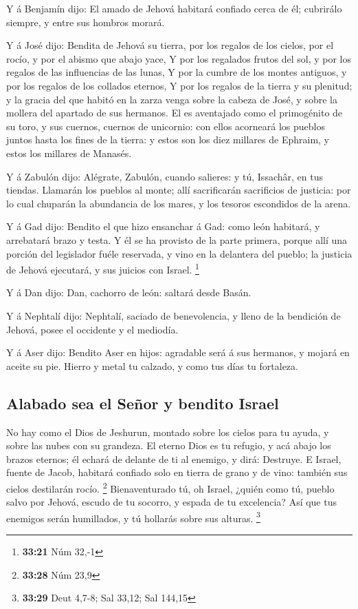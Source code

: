  Y á Benjamín dijo: El amado de Jehová habitará confiado
cerca de él; cubrirálo siempre, y entre sus hombros morará.

 Y á José dijo: Bendita de Jehová su tierra, por los
regalos de los cielos, por el rocío, y por el abismo que abajo yace,
 Y por los regalados frutos del sol, y por los regalos de
las influencias de las lunas,  Y por la cumbre de los
montes antiguos, y por los regalos de los collados eternos,
 Y por los regalos de la tierra y su plenitud; y la gracia
del que habitó en la zarza venga sobre la cabeza de José, y sobre la
mollera del apartado de sus hermanos.  El es aventajado
como el primogénito de su toro, y sus cuernos, cuernos de unicornio: con
ellos acorneará los pueblos juntos hasta los fines de la tierra: y estos
son los diez millares de Ephraim, y estos los millares de Manasés.

 Y á Zabulón dijo: Alégrate, Zabulón, cuando salieres: y
tú, Issachâr, en tus tiendas.  Llamarán los pueblos al
monte; allí sacrificarán sacrificios de justicia: por lo cual chuparán
la abundancia de los mares, y los tesoros escondidos de la arena.

 Y á Gad dijo: Bendito el que hizo ensanchar á Gad: como
león habitará, y arrebatará brazo y testa.  Y él se ha
provisto de la parte primera, porque allí una porción del legislador
fuéle reservada, y vino en la delantera del pueblo; la justicia de
Jehová ejecutará, y sus juicios con Israel. \footnote{\textbf{33:21} Núm
  32,-1}

 Y á Dan dijo: Dan, cachorro de león: saltará desde Basán.

 Y á Nephtalí dijo: Nephtalí, saciado de benevolencia, y
lleno de la bendición de Jehová, posee el occidente y el mediodía.

 Y á Aser dijo: Bendito Aser en hijos: agradable será á sus
hermanos, y mojará en aceite su pie.  Hierro y metal tu
calzado, y como tus días tu fortaleza.

\hypertarget{alabado-sea-el-seuxf1or-y-bendito-israel}{%
\subsection{Alabado sea el Señor y bendito
Israel}\label{alabado-sea-el-seuxf1or-y-bendito-israel}}

 No hay como el Dios de Jeshurun, montado sobre los cielos
para tu ayuda, y sobre las nubes con su grandeza.  El
eterno Dios es tu refugio, y acá abajo los brazos eternos; él echará de
delante de ti al enemigo, y dirá: Destruye.  E Israel,
fuente de Jacob, habitará confiado solo en tierra de grano y de vino:
también sus cielos destilarán rocío. \footnote{\textbf{33:28} Núm 23,9}
 Bienaventurado tú, oh Israel, ¿quién como tú, pueblo salvo
por Jehová, escudo de tu socorro, y espada de tu excelencia? Así que tus
enemigos serán humillados, y tú hollarás sobre sus alturas. \footnote{\textbf{33:29}
  Deut 4,7-8; Sal 33,12; Sal 144,15}

